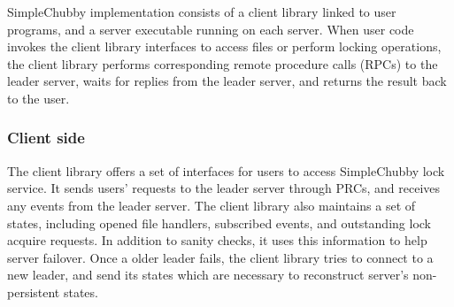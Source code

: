 %

SimpleChubby implementation consists of a client library linked to user programs,
and a server executable running on each server.
When user code invokes the client library interfaces to access files or perform locking operations,
the client library performs corresponding remote procedure calls (RPCs) to the leader server,
waits for replies from the leader server, and returns the result back to the user.

\subsubsection{Client side}
The client library offers a set of interfaces for users to access SimpleChubby
lock service. It sends users' requests to the leader server through PRCs,
and receives any events from the leader server.
The client library also maintains a set of states, including opened file handlers,
subscribed events, and outstanding lock acquire requests.
In addition to sanity checks, it uses this information to help server failover.
Once a older leader fails, the client library tries to connect to a new leader,
and send its states which are necessary to reconstruct server's non-persistent
states.


